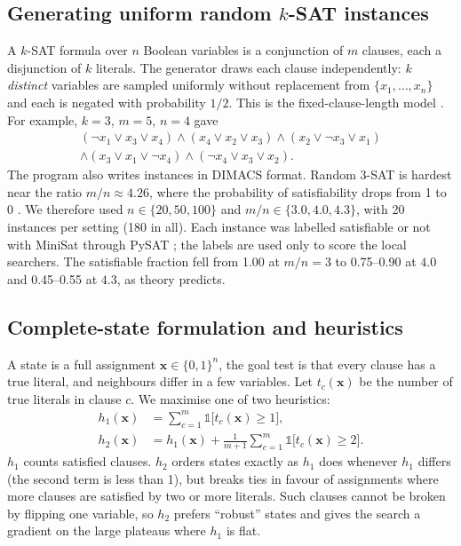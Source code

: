 \documentclass[journal]{IEEEtran}
\begin{document}
\subsection{Generating uniform random $k$-SAT instances}
A $k$-SAT formula over $n$ Boolean variables is a conjunction of $m$ clauses, each a
disjunction of $k$ literals. The generator draws each clause independently: $k$
\emph{distinct} variables are sampled uniformly without replacement from $\{x_1,\dots,x_n\}$
and each is negated with probability $1/2$. This is the fixed-clause-length model
\cite{mitchell1992}. For example, $k=3$, $m=5$, $n=4$ gave
\begin{multline*}
(\lnot x_1 \lor x_3 \lor x_4)\land(x_4\lor x_2\lor x_3)\land(x_2\lor\lnot x_3\lor x_1)\\
\land(x_3\lor x_1\lor\lnot x_4)\land(\lnot x_4\lor x_3\lor x_2).
\end{multline*}
The program also writes instances in DIMACS format. Random 3-SAT is hardest near the ratio
$m/n\approx4.26$, where the probability of satisfiability drops from 1 to 0 \cite{mitchell1992}.
We therefore used $n\in\{20,50,100\}$ and $m/n\in\{3.0,4.0,4.3\}$, with 20 instances per
setting (180 in all). Each instance was labelled satisfiable or not with MiniSat through PySAT
\cite{pysat}; the labels are used only to score the local searchers. The satisfiable fraction
fell from 1.00 at $m/n=3$ to 0.75--0.90 at $4.0$ and 0.45--0.55 at $4.3$, as theory predicts.

\subsection{Complete-state formulation and heuristics}
A state is a full assignment $\mathbf{x}\in\{0,1\}^n$, the goal test is that every clause has
a true literal, and neighbours differ in a few variables. Let $t_c(\mathbf{x})$ be the number
of true literals in clause $c$. We maximise one of two heuristics:
\begin{align}
h_1(\mathbf{x}) &= \sum_{c=1}^{m} \mathbb{1}\bigl[t_c(\mathbf{x})\ge1\bigr],\\
h_2(\mathbf{x}) &= h_1(\mathbf{x}) + \frac{1}{m+1}\sum_{c=1}^{m}\mathbb{1}\bigl[t_c(\mathbf{x})\ge2\bigr].
\end{align}
$h_1$ counts satisfied clauses. $h_2$ orders states exactly as $h_1$ does whenever $h_1$
differs (the second term is less than 1), but breaks ties in favour of assignments where more
clauses are satisfied by two or more literals. Such clauses cannot be broken by flipping one
variable, so $h_2$ prefers ``robust'' states and gives the search a gradient on the large
plateaus where $h_1$ is flat.
\end{document}
